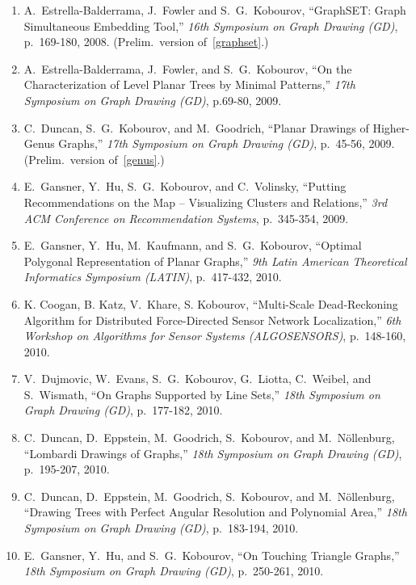 \documentclass[10pt]{article}
\begin{document}
\begin{description}
\begin{enumerate}
\item A.~Estrella-Balderrama, J.~Fowler and S.~G.~Kobourov, ``GraphSET: Graph Simultaneous Embedding Tool,'' {\em 16th Symposium on Graph Drawing (GD)}, p.~169-180, 2008. (Prelim.~version of~\ref{graphset}.)

\item A.~Estrella-Balderrama, J.~Fowler, and S.~G.~Kobourov, ``On the Characterization of Level Planar Trees by Minimal Patterns,'' {\em 17th Symposium on Graph Drawing (GD)}, p.69-80, 2009. 

\item C.~Duncan, S.~G.~Kobourov, and M.~Goodrich, ``Planar Drawings of Higher-Genus Graphs,'' {\em 17th Symposium on Graph Drawing (GD)}, p.~45-56, 2009. (Prelim.~version of~\ref{genus}.)

\item E.~Gansner, Y.~Hu, S.~G.~Kobourov, and C.~Volinsky, ``Putting Recommendations on the Map -- Visualizing Clusters and Relations,'' {\em 3rd ACM Conference on Recommendation Systems}, p.~345-354, 2009. 

\item E.~Gansner, Y.~Hu, M.~Kaufmann, and S.~G.~Kobourov, ``Optimal Polygonal Representation of Planar Graphs,'' {\em 9th Latin American Theoretical Informatics Symposium (LATIN)}, p.~417-432, 2010.

\item K. Coogan, B. Katz, V.~Khare, S. Kobourov, ``Multi-Scale
  Dead-Reckoning Algorithm for Distributed Force-Directed Sensor
  Network Localization,'' {\em 6th Workshop on Algorithms for Sensor
    Systems (ALGOSENSORS)}, p.~148-160, 2010.

\item V.~Dujmovic, W.~Evans, S.~G.~Kobourov, G.~Liotta, C.~Weibel, and
  S.~Wismath, ``On Graphs Supported by Line Sets,''  {\em 18th
    Symposium on Graph Drawing (GD)}, p.~177-182, 2010.

\item C.~Duncan, D.~Eppstein, M.~Goodrich, S.~Kobourov, and
  M.~N{\"o}llenburg, ``Lombardi Drawings of Graphs,'' {\em 18th
    Symposium on Graph Drawing (GD)}, p.~195-207, 2010.

\item C.~Duncan, D.~Eppstein, M.~Goodrich, S.~Kobourov, and
  M.~N{\"o}llenburg, ``Drawing Trees with Perfect Angular Resolution
  and Polynomial Area,'' {\em 18th Symposium on Graph Drawing (GD)},
  p.~183-194, 2010.

\item E.~Gansner, Y.~Hu, and S.~G.~Kobourov, ``On Touching Triangle
  Graphs,'' {\em 18th Symposium on Graph Drawing (GD)}, p.~250-261, 2010.


\end{enumerate}
\end{description}
\end{document}
